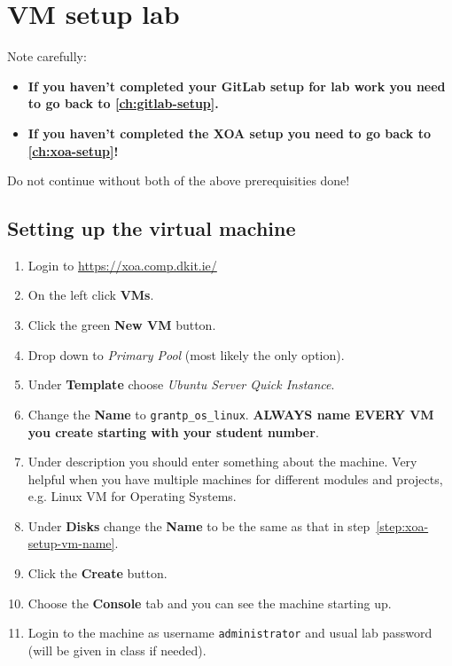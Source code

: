 \chapter{VM setup lab}
\label{ch:vm-setup-lab}

Note carefully:
\begin{itemize}
\item \textbf{If you haven't completed your GitLab setup for lab work you need to go back to \autoref{ch:gitlab-setup}.}
\item \textbf{If you haven't completed the XOA setup you need to go back to \autoref{ch:xoa-setup}!}
\end{itemize}
Do not continue without both of the above prerequisities done!

\section{Setting up the virtual machine}

\begin{enumerate}
\item Login to \url{https://xoa.comp.dkit.ie/}
\item On the left click \textbf{VMs}.
\item Click the green \textbf{New VM} button.
\item Drop down to \textit{Primary Pool} (most likely the only option).
\item Under \textbf{Template} choose \textit{Ubuntu Server Quick Instance}.
\item Change the \textbf{Name} to \texttt{grantp\_os\_linux}. \textbf{ALWAYS name EVERY VM you create starting with your student number}. \label{step:xoa-setup-vm-name}
\item Under description you should enter something about the machine.
  Very helpful when you have multiple machines for different modules and projects, e.g. Linux VM for Operating Systems.
\item Under \textbf{Disks} change the \textbf{Name} to be the same as that in step~\ref{step:xoa-setup-vm-name}.
\item Click the \textbf{Create} button.
\item Choose the \textbf{Console} tab and you can see the machine starting up.
\item Login to the machine as username \texttt{administrator} and usual lab password (will be given in class if needed). 
\end{enumerate}

